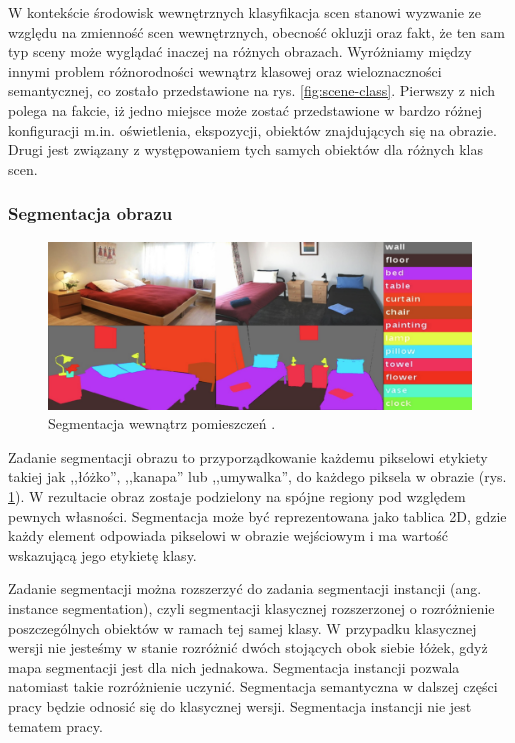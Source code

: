 W kontekście środowisk wewnętrznych klasyfikacja scen stanowi wyzwanie ze względu na zmienność scen wewnętrznych, obecność okluzji oraz fakt, że ten sam typ sceny może wyglądać inaczej na różnych obrazach. Wyróżniamy między innymi problem różnorodności wewnątrz klasowej oraz wieloznaczności semantycznej, co zostało przedstawione na rys. \ref{fig:scene-class}. Pierwszy z nich polega na fakcie, iż jedno miejsce może zostać przedstawione w bardzo różnej konfiguracji m.in. oświetlenia, ekspozycji, obiektów znajdujących się na obrazie. Drugi jest związany z występowaniem tych samych obiektów dla różnych klas scen.

\subsubsection{Segmentacja obrazu}
\begin{figure}[ht!]
    \includegraphics[width=\textwidth]{img/segment.png}
    \caption{Segmentacja wewnątrz pomieszczeń \cite{zhang2018context}.}
    \label{fig:segment}
  \end{figure}
  
Zadanie segmentacji obrazu to przyporządkowanie każdemu pikselowi etykiety takiej jak ,,łóżko'', ,,kanapa'' lub ,,umywalka'', do każdego piksela w obrazie (rys. \ref{fig:segment}). W rezultacie obraz zostaje podzielony na spójne regiony pod względem pewnych własności. Segmentacja może być reprezentowana jako tablica 2D, gdzie każdy element odpowiada pikselowi w obrazie wejściowym i ma wartość wskazującą jego etykietę klasy.

Zadanie segmentacji można rozszerzyć do zadania segmentacji instancji (ang. instance segmentation), czyli segmentacji klasycznej rozszerzonej o rozróżnienie poszczególnych obiektów w ramach tej samej klasy. W przypadku klasycznej wersji nie jesteśmy w stanie rozróżnić dwóch stojących obok siebie łóżek, gdyż mapa segmentacji jest dla nich jednakowa. Segmentacja instancji pozwala natomiast takie rozróżnienie uczynić. Segmentacja semantyczna w dalszej części pracy będzie odnosić się do klasycznej wersji. Segmentacja instancji nie jest tematem pracy.

